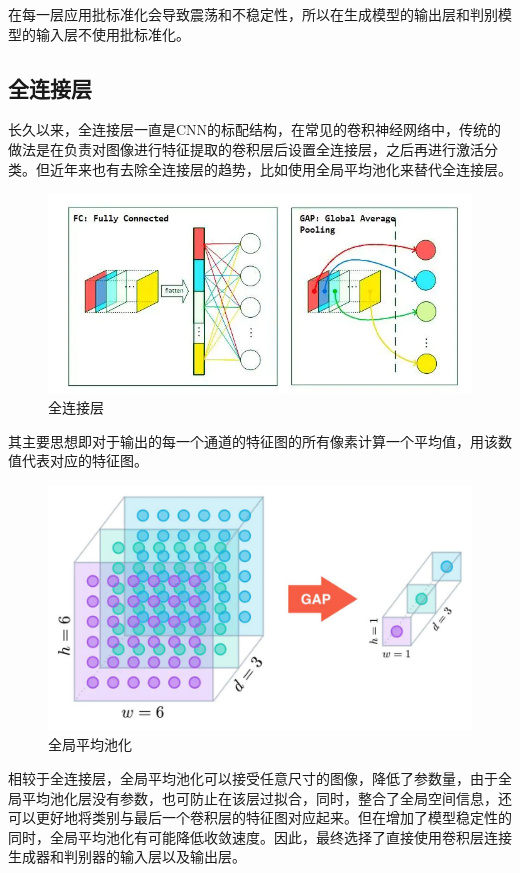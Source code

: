 \documentclass[
  hyperref, a4paper]{ctexart}
\begin{document}
在每一层应用批标准化会导致震荡和不稳定性，所以在生成模型的输出层和判别模型的输入层不使用批标准化。

\hypertarget{ux5168ux8fdeux63a5ux5c42}{%
\subsection{全连接层}\label{ux5168ux8fdeux63a5ux5c42}}

长久以来，全连接层一直是CNN的标配结构，在常见的卷积神经网络中，传统的做法是在负责对图像进行特征提取的卷积层后设置全连接层，之后再进行激活分类。但近年来也有去除全连接层的趋势，比如使用全局平均池化来替代全连接层。

\begin{figure}
\centering
\includegraphics{./10.png}
\caption{全连接层}
\end{figure}

其主要思想即对于输出的每一个通道的特征图的所有像素计算一个平均值，用该数值代表对应的特征图。

\begin{figure}
\centering
\includegraphics{./11.jpg}
\caption{全局平均池化}
\end{figure}

相较于全连接层，全局平均池化可以接受任意尺寸的图像，降低了参数量，由于全局平均池化层没有参数，也可防止在该层过拟合，同时，整合了全局空间信息，还可以更好地将类别与最后一个卷积层的特征图对应起来。但在增加了模型稳定性的同时，全局平均池化有可能降低收敛速度。因此，最终选择了直接使用卷积层连接生成器和判别器的输入层以及输出层。
\end{document}
